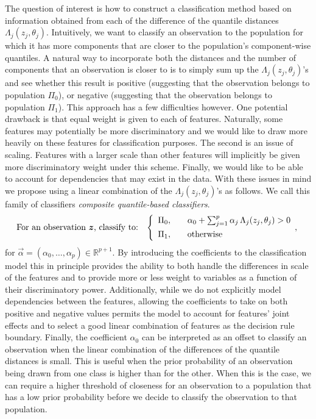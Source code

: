 The question of interest is how to construct a classification method based on
information obtained from each of the difference of the quantile distances
$\Lambda_j(z_j, \theta_j)$.  Intuitively, we want to classify an observation to
the population for which it has more components that are closer to the
population's component-wise quantiles.  A natural way to incorporate both the
distances and the number of components that an observation is closer to is to
simply sum up the $\Lambda_j(z_j, \theta_j)$'s and see whether this result is
positive (suggesting that the observation belongs to population $\Pi_0$), or
negative (suggesting that the observation belongs to population $\Pi_1$).  This
approach has a few difficulties however.  One potential drawback is that equal
weight is given to each of features.  Naturally, some features may potentially
be more discriminatory and we would like to draw more heavily on these features
for classification purposes.  The second is an issue of scaling.  Features with
a larger scale than other features will implicitly be given more discriminatory
weight under this scheme.  Finally, we would like to be able to account for
dependencies that may exist in the data.  With these issues in mind we propose
using a linear combination of the $\Lambda_j(z_j, \theta_j)$'s as follows.  We
call this family of classifiers \emph{composite quantile-based classifiers}.
\begin{equation}
  \label{eq:composite-classifier}
  \text{For an observation $\vec{z}$, classify to:} \hspace{3mm}
  \left\{
    \begin{array}{lll}
      \Pi_0, & & %
                 \alpha_0 + \sum_{j=1}^p \alpha_j \,
                 \Lambda_j (z_j, \theta_j) > 0 \\[1ex]
      \Pi_1, & & \text{otherwise}
    \end{array} ,
  \right.
\end{equation}
for $\vec{\alpha} = (\alpha_0, \dots, \alpha_p) \in \mathbb{R}^{p+1}$.  By
introducing the coefficients to the classification model this in principle
provides the ability to both handle the differences in scale of the features and
to provide more or less weight to variables as a function of their
discriminatory power. Additionally, while we do not explicitly model
dependencies between the features, allowing the coefficients to take on both
positive and negative values permits the model to account for features' joint
effects and to select a good linear combination of features as the decision rule
boundary.  Finally, the coefficient $\alpha_0$ can be interpreted as an offset
to classify an observation when the linear combination of the differences of the
quantile distances is small.  This is useful when the prior probability of an
observation being drawn from one class is higher than for the other.  When this
is the case, we can require a higher threshold of closeness for an observation
to a population that has a low prior probability before we decide to classify
the observation to that population.


